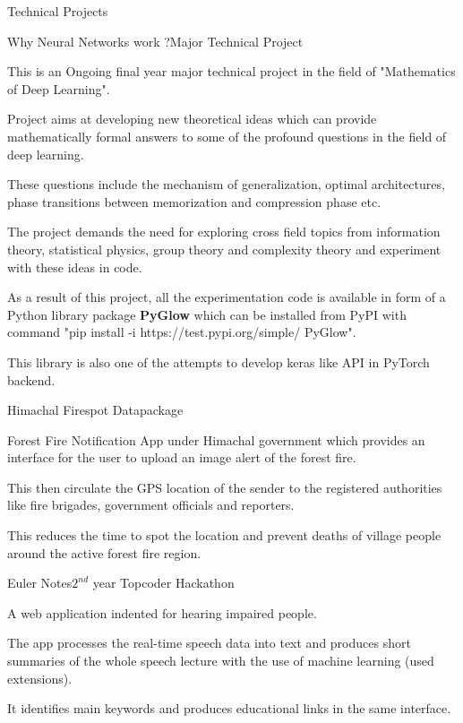 \documentclass{resume} %
\begin{document}
\newpage
\begin{rSection}{Technical Projects}

\begin{rSubsection}{Why Neural Networks work ?}{Major Technical Project}{}{}
\item This is an Ongoing final year major technical project in the field of "Mathematics of Deep Learning".
\item Project aims at developing new theoretical ideas which can provide mathematically formal answers to some of the profound questions in the field of deep learning.
\item These questions include the mechanism of generalization, optimal architectures, phase transitions between memorization and compression phase etc.
\item The project demands the need for exploring cross field topics from information theory, statistical physics, group theory and complexity theory and experiment with these ideas in code.
\item As a result of this project, all the experimentation code is available in form of a Python library package \textbf{PyGlow} which can be installed from PyPI with command "pip install -i https://test.pypi.org/simple/ PyGlow".
\item This library is also one of the attempts to develop keras like API in PyTorch backend.
\end{rSubsection}
\begin{rSubsection}{Himachal Firespot Datapackage}{}{}{}
\item Forest Fire Notification App under Himachal government which provides an interface for the user to
upload an image alert of the forest fire. 
\item This then circulate the GPS location of the sender  to the registered authorities like fire brigades, government officials and reporters. 
\item This reduces the time to spot the location and prevent deaths of village people around the active forest fire region. 
\end{rSubsection}

\begin{rSubsection}{Euler Notes}{$2^{nd}$ year Topcoder Hackathon}{}{}
\item A web application indented for hearing impaired people. 
\item The app processes the real-time speech data into text and produces short summaries of the whole speech lecture with the use of machine learning (used extensions). 
\item It identifies main keywords and produces educational links in the same interface.
\end{rSubsection}

\end{rSection}
\end{document}
